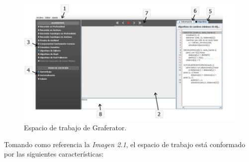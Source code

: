 \documentclass{book}
\begin{document}
\begin{figure}[H]
	\centering
	\includegraphics[width=1.0\textwidth]{images/ventanas/01.png}
	\caption{Espacio de trabajo de Graferator.}
\end{figure}
\bigskip


Tomando como referencia la \textit{Imagen 2.1}, el espacio de trabajo está conformado por las siguientes características:
\end{document}
